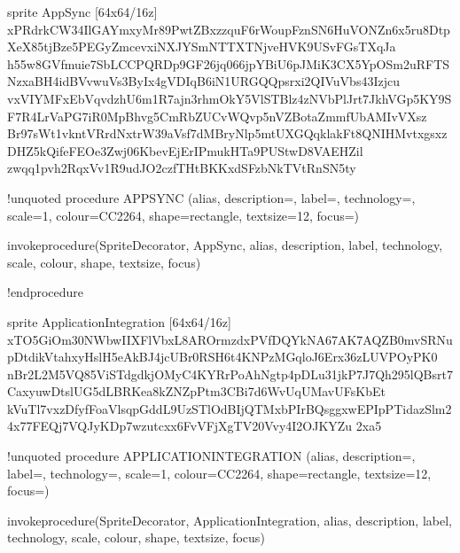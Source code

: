 \documentclass[letterpaper,10pt,english]{sphinxmanual}
\begin{document}
\begin{sphinxVerbatim}[commandchars=\\\{\},numbers=left,firstnumber=1,stepnumber=1]
sprite \PYGZdl{}AppSync [64x64/16z] \PYGZob{}
xPRdrkCW34IlGAYmx\PYGZus{}\PYGZhy{}yMr89PwtZBxzzquF6rWoupFznSN6HuVONZ\PYGZus{}n6x5ru8DtpX\PYGZhy{}eX85tjBze5PEGyZmcevxiNXJY\PYGZus{}SmNTTXT\PYGZhy{}NjveHVK9US\PYGZus{}vFGsTXqJa
h55w8GVfmuie7SbLCCPQRDp9G\PYGZus{}F26jq066jpYBiU6pJMiK3CX5YpOSm2uRFTSNzxaBH4idBVvwuVs3ByIx4gVD\PYGZus{}IqB6iN1URGQ\PYGZus{}Qpsrxi2QIVuVbs43Izjcu
vxVIYMFxEbVqvdzhU6m1R7ajn3rhmOkY5VlSTBl\PYGZus{}z4zNVbPlJrt7JkhVGp5KY9SF7R4LrVaPG7iR0MpBhvg\PYGZus{}5CmRbZUCvWQvp5\PYGZhy{}nVZBotaZmmfUbAMIvVXsz
Br97sWt1vkntVRr\PYGZhy{}dNxtr\PYGZhy{}W3\PYGZus{}9aVsf\PYGZus{}7dMBryNlp5mtUXGQqk\PYGZhy{}lakFt8QNIHMvtxgsxzDHZ5kQifeFEOe3Zwj06K\PYGZus{}bevEjErIPmukHTa9PUStwD8VA\PYGZhy{}EHZil
zwqq1p\PYGZhy{}vh2RqxVv1R9udJO2czfTHtB\PYGZhy{}KKxdSFzbNkTVtRnSN5ty
\PYGZcb{}

!unquoted procedure \PYGZdl{}APPSYNC (\PYGZdl{}alias, \PYGZdl{}description=\PYGZdq{}\PYGZdq{}, \PYGZdl{}label=\PYGZdq{}\PYGZdq{}, \PYGZdl{}technology=\PYGZdq{}\PYGZdq{}, \PYGZdl{}scale=1, \PYGZdl{}colour=\PYGZdq{}CC2264\PYGZdq{}, \PYGZdl{}shape=\PYGZdq{}rectangle\PYGZdq{}, \PYGZdl{}textsize=\PYGZdq{}12\PYGZdq{}, \PYGZdl{}focus=\PYGZdq{}\PYGZdq{})

\PYGZpc{}invoke\PYGZus{}procedure(\PYGZdl{}SpriteDecorator, \PYGZdq{}\PYGZdl{}AppSync\PYGZdq{}, \PYGZdl{}alias, \PYGZdl{}description, \PYGZdl{}label, \PYGZdl{}technology, \PYGZdl{}scale, \PYGZdl{}colour, \PYGZdl{}shape, \PYGZdl{}textsize, \PYGZdl{}focus)

!endprocedure

sprite \PYGZdl{}ApplicationIntegration [64x64/16z] \PYGZob{}
xTO5GiOm30NWbwIIXFlVbxL8AROrmzdxPVfDQ\PYGZus{}YkNA67AK7AQZB0mvSRNupDtdikVtahxyHslH5eAkBJ4jcUBr0RSH6t4KNPzMG\PYGZhy{}qloJ6Erx36zLUVPOyPK0
nBr2L2M5VQ8\PYGZhy{}5\PYGZus{}ViST\PYGZus{}dgdkjOMyC4KYRrPoAhNgtp4pDLu31jkP7\PYGZhy{}J7Qh295lQBsrt7Caxyu\PYGZus{}wDtslUG5dLBRKea8kZNZpPtm3CBi7d6WvUqUMavUFsK\PYGZhy{}bEt
kVuTl7vxzDfyfFoaVlsqpGddL9UzSTlOdBIjQTMxbPIrB\PYGZhy{}QsggxwEPI\PYGZhy{}pPTidazSlm24x77FEQj7VQJyKDp7\PYGZhy{}wzu\PYGZus{}tc\PYGZhy{}\PYGZus{}xx6FvVFjXgTV20Vvy4I2O\PYGZus{}JKYZu
2xa5
\PYGZcb{}

!unquoted procedure \PYGZdl{}APPLICATIONINTEGRATION (\PYGZdl{}alias, \PYGZdl{}description=\PYGZdq{}\PYGZdq{}, \PYGZdl{}label=\PYGZdq{}\PYGZdq{}, \PYGZdl{}technology=\PYGZdq{}\PYGZdq{}, \PYGZdl{}scale=1, \PYGZdl{}colour=\PYGZdq{}CC2264\PYGZdq{}, \PYGZdl{}shape=\PYGZdq{}rectangle\PYGZdq{}, \PYGZdl{}textsize=\PYGZdq{}12\PYGZdq{}, \PYGZdl{}focus=\PYGZdq{}\PYGZdq{})

\PYGZpc{}invoke\PYGZus{}procedure(\PYGZdl{}SpriteDecorator, \PYGZdq{}\PYGZdl{}ApplicationIntegration\PYGZdq{}, \PYGZdl{}alias, \PYGZdl{}description, \PYGZdl{}label, \PYGZdl{}technology, \PYGZdl{}scale, \PYGZdl{}colour, \PYGZdl{}shape, \PYGZdl{}textsize, \PYGZdl{}focus)


\end{sphinxVerbatim}
\end{document}
